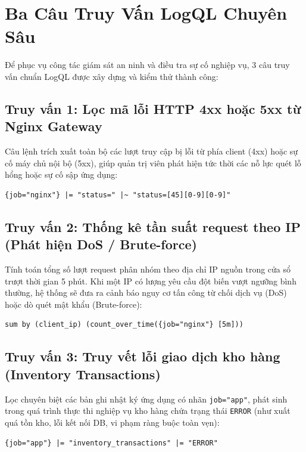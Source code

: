 \documentclass[12pt,a4paper,oneside]{report}
\begin{document}
\section{Ba Câu Truy Vấn LogQL Chuyên Sâu}
Để phục vụ công tác giám sát an ninh và điều tra sự cố nghiệp vụ, 3 câu truy vấn chuẩn LogQL được xây dựng và kiểm thử thành công:

\subsection{Truy vấn 1: Lọc mã lỗi HTTP 4xx hoặc 5xx từ Nginx Gateway}
Câu lệnh trích xuất toàn bộ các lượt truy cập bị lỗi từ phía client (4xx) hoặc sự cố máy chủ nội bộ (5xx), giúp quản trị viên phát hiện tức thời các nỗ lực quét lỗ hổng hoặc sự cố sập ứng dụng:
\begin{lstlisting}
{job="nginx"} |= "status=" |~ "status=[45][0-9][0-9]"
\end{lstlisting}

\subsection{Truy vấn 2: Thống kê tần suất request theo IP (Phát hiện DoS / Brute-force)}
Tính toán tổng số lượt request phân nhóm theo địa chỉ IP nguồn trong cửa sổ trượt thời gian 5 phút. Khi một IP có lượng yêu cầu đột biến vượt ngưỡng bình thường, hệ thống sẽ đưa ra cảnh báo nguy cơ tấn công từ chối dịch vụ (DoS) hoặc dò quét mật khẩu (Brute-force):
\begin{lstlisting}
sum by (client_ip) (count_over_time({job="nginx"} [5m]))
\end{lstlisting}

\subsection{Truy vấn 3: Truy vết lỗi giao dịch kho hàng (Inventory Transactions)}
Lọc chuyên biệt các bản ghi nhật ký ứng dụng có nhãn \texttt{job="app"}, phát sinh trong quá trình thực thi nghiệp vụ kho hàng chứa trạng thái \texttt{ERROR} (như xuất quá tồn kho, lỗi kết nối DB, vi phạm ràng buộc toàn vẹn):
\begin{lstlisting}
{job="app"} |= "inventory_transactions" |= "ERROR"
\end{lstlisting}

\end{document}
